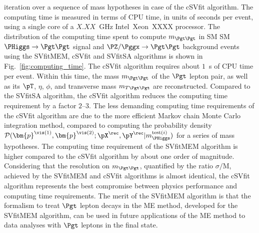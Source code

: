 iteration over a sequence of mass hypotheses in case of the cSVfit
algorithm.
The computing time is measured in terms of CPU time, in
units of seconds per event, using a single core of a $X.XX$~GHz
Intel\TReg~Xeon\TReg~XXXX processor.
The distribution of the computing time spent to compute $m_{\Pgt\Pgt}$
in SM SM $\PHiggs \to \Pgt\Pgt$ signal and $\PZ/\Pggx \to \Pgt\Pgt$ background events
using the SVfitMEM, cSVfit and SVfitSA algorithms is shown in
Fig.~\ref{fig:computing_time}.
The cSVfit algorithm requires about $1$~s of CPU time per event.
Within this time, the mass $m_{\Pgt\Pgt}$ of the $\Pgt$ lepton pair,
as well as its $\pT$, $\eta$, $\phi$, and transverse mass
$m_{T\Pgt\Pgt}$ are reconstructed.
Compared to the SVfitSA algorithm, the cSVfit algorithm reduces the
computing time requirement by a factor $2$--$3$. 
The less demanding computing time requirements of the cSVfit algorithm
are due to the more efficient Markov chain Monte
Carlo integration method, compared to
computing the probability density
$\mathcal{P}(\bm{p}^{\vis(1)},\bm{p}^{\vis(2)};\pX^{\rec},\pY^{\rec}|m_{\PHiggs}^{\textrm{test}(i)})$
for a series of mass hypotheses.
The computing time requirement of the SVfitMEM algorithm is higher
compared to the cSVfit algorithm by about one order of
magnitude. Considering that the resolution on $m_{\Pgt\Pgt}$,
quantified by the ratio $\sigma/\textrm{M}$, achieved
by the SVfitMEM and cSVfit algorithms is almost identical, the cSVfit
algorithm represents the best compromise between physics performance and computing time requirements.
The merit of the SVfitMEM algorithm is that the 
formalism to treat $\Pgt$ lepton decays in the ME method, developed
for the SVfitMEM algorithm, can be used
in future applications of the ME method to data analyses with $\Pgt$
leptons in the final state.

